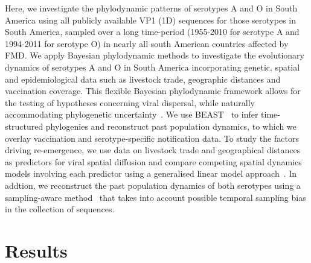 \documentclass[10pt]{article}
\begin{document}
Here, we investigate the phylodynamic patterns of serotypes A and O in South America using all publicly available VP1 (1D) sequences for those serotypes in South America, sampled over a long time-period (1955-2010 for serotype A and 1994-2011 for serotype O) in nearly all south American countries affected by FMD.
We apply Bayesian phylodynamic methods to investigate the evolutionary dynamics of serotypes A and O in South America incorporating  genetic, spatial and epidemiological data such as livestock trade, geographic distances and vaccination coverage.
This flexible Bayesian phylodynamic framework allows for the testing of hypotheses concerning viral dispersal, while naturally accommodating phylogenetic uncertainty~\citep{Lemey2009, Faria2011, Lemey2014, Gill2016}. %
We use BEAST~\citep{Suchard2018} to infer time-structured phylogenies and reconstruct past population dynamics, to which we overlay vaccination and serotype-specific notification data.
To study the factors driving re-emergence, we use data on livestock trade and geographical distances as predictors for viral spatial diffusion and compare competing spatial dynamics models involving each predictor using a generalised linear model approach~\citep{Faria2013,Lemey2014}.
In addtion, we reconstruct the past population dynamics of both serotypes using a sampling-aware method~\citep{Karcher2016,Karcher2020} that takes into account possible temporal sampling bias in the collection of sequences. %

\section*{Results}
\end{document}
